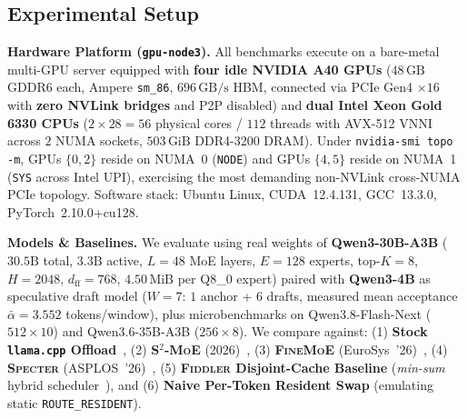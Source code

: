 \documentclass[10pt,twocolumn]{article}
\theoremstyle{definition}
\begin{document}
\subsection{Experimental Setup}
\label{sec:setup}

\noindent\textbf{Hardware Platform (\texttt{gpu-node3}).}
All benchmarks execute on a bare-metal multi-GPU server equipped with \textbf{four idle NVIDIA A40 GPUs} ($48\,\text{GB}$ GDDR6 each, Ampere \texttt{sm\_86}, $696\,\text{GB/s}$ HBM, connected via PCIe Gen4 $\times 16$ with \textbf{zero NVLink bridges} and P2P disabled) and \textbf{dual Intel Xeon Gold 6330 CPUs} ($2 \times 28 = 56$ physical cores / $112$ threads with AVX-512 VNNI across $2$ NUMA sockets, $503\,\text{GiB}$ DDR4-3200 DRAM). Under \texttt{nvidia-smi topo -m}, GPUs $\{0, 2\}$ reside on NUMA~0 (\texttt{NODE}) and GPUs $\{4, 5\}$ reside on NUMA~1 (\texttt{SYS} across Intel UPI), exercising the most demanding non-NVLink cross-NUMA PCIe topology. Software stack: Ubuntu Linux, CUDA~12.4.131, GCC~13.3.0, PyTorch~2.10.0+cu128.

\vspace{2pt}
\noindent\textbf{Models \& Baselines.}
We evaluate using real weights of \textbf{Qwen3-30B-A3B} ($30.5\text{B}$ total, $3.3\text{B}$ active, $L=48$ MoE layers, $E=128$ experts, top-$K=8$, $H=2048$, $d_{\text{ff}}=768$, $4.50\,\text{MiB}$ per Q8\_0 expert) paired with \textbf{Qwen3-4B} as speculative draft model ($W=7$: $1$ anchor + $6$ drafts, measured mean acceptance $\bar{\alpha} = 3.552$ tokens/window), plus microbenchmarks on Qwen3.8-Flash-Next ($512 \times 10$) and Qwen3.6-35B-A3B ($256 \times 8$). We compare against: (1) \textbf{Stock \texttt{llama.cpp} Offload}~\cite{llamacpp}, (2) \textbf{\textsc{S$^2$-MoE}} (2026)~\cite{s2moe2026}, (3) \textbf{\textsc{FineMoE}} (EuroSys~'26)~\cite{finemoe2026}, (4) \textbf{\textsc{Specter}} (ASPLOS~'26)~\cite{specter2026}, (5) \textbf{\textsc{Fiddler} Disjoint-Cache Baseline} (\emph{min-sum} hybrid scheduler~\cite{kamahori2025fiddler}), and (6) \textbf{Naive Per-Token Resident Swap} (emulating static \texttt{ROUTE\_RESIDENT}).
\end{document}
